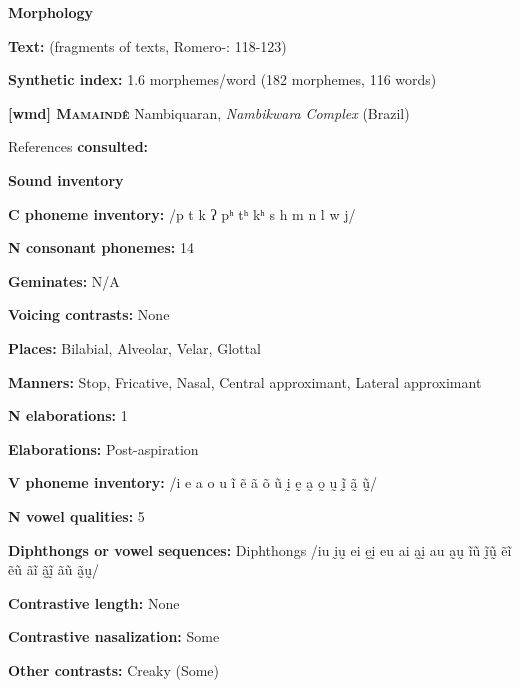 \textbf{Morphology}



\textbf{Text:} (fragments of texts, Romero-\citealt{Figeroa1997}: 118-123)



\textbf{Synthetic index:} 1.6 morphemes/word (182 morphemes, 116 words)



\textbf{[wmd] \textsc{Mamaindê}}  Nambiquaran, \textit{Nambikwara} \textit{Complex} (Brazil)



References \textbf{consulted:} \citet{Eberhard2009}



\textbf{Sound inventory}



\textbf{C phoneme inventory:} /p t k ʔ pʰ tʰ kʰ s h m n l w j/



\textbf{N consonant phonemes:} 14



\textbf{Geminates:} N/A



\textbf{Voicing contrasts:} None



\textbf{Places:} Bilabial, Alveolar, Velar, Glottal



\textbf{Manners:} Stop, Fricative, Nasal, Central approximant, Lateral approximant



\textbf{N elaborations:} 1



\textbf{Elaborations:} Post-aspiration



\textbf{V phoneme inventory:} /i e a o u ĩ ẽ ã õ ũ ḭ ḛ a̰ o̰ ṵ ḭ̃ ã̰ ṵ̃/



\textbf{N vowel qualities:} 5



\textbf{Diphthongs or vowel sequences:} Diphthongs /iu ḭṵ ei ḛḭ eu ai a̰ḭ au a̰ṵ ĩũ ḭ̃ṵ̃ ẽĩ ẽũ ãĩ ã̰ḭ̃ ãũ ã̰ṵ/



\textbf{Contrastive length:} None



\textbf{Contrastive nasalization:} Some



\textbf{Other contrasts:} Creaky (Some)




